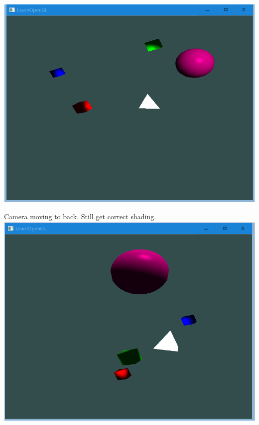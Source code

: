 \documentclass[acmtog]{acmart}
\begin{document}
\includegraphics[scale=0.5]{2}
\par Camera moving to back. Still get correct shading.\\
\includegraphics[scale=0.5]{3}
\end{document}
